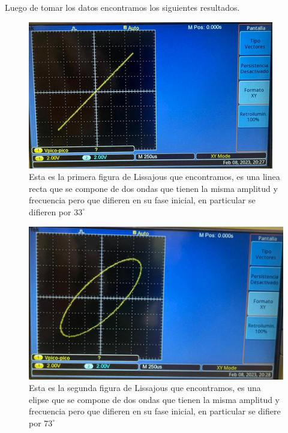 \documentclass[a4paper, amsfonts, amssymb, amsmath, reprint, showkeys, nofootinbib, twoside]{revtex4-1}
\begin{document}
Luego de tomar los datos encontramos los siguientes resultados.
\begin{figure}[H]
    \centering
    \includegraphics[scale=0.4]{Exp1_Img1.jpeg}
    \caption{Esta es la primera figura de Lissajous que encontramos, es una linea recta que se compone de dos ondas que tienen la misma amplitud y frecuencia pero que difieren en su fase inicial, en particular se difieren por $33^\circ$}
    \label{fig:Recta}
\end{figure}

\begin{figure}[H]
    \centering
    \includegraphics[scale=0.4]{Exp1_Img2.jpeg}
    \caption{Esta es la segunda figura de Lissajous que encontramos, es una elipse que se compone de dos ondas que tienen la misma amplitud y frecuencia pero que difieren en su fase inicial, en particular se difiere por $73^\circ$}
    \label{fig:Elipse}
\end{figure}
\end{document}
